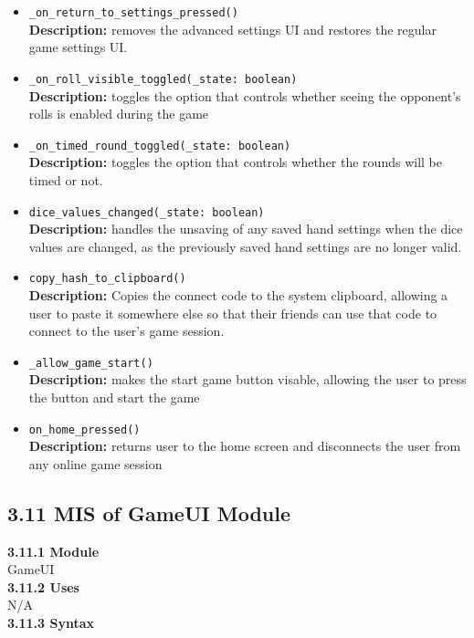 \documentclass[12pt, titlepage]{article}
\begin{document}
\begin{itemize}
	\item \texttt{\_on\_return\_to\_settings\_pressed() }\\
	\textbf{Description:} removes the advanced settings UI and restores the regular game settings UI.
	\item \texttt{\_on\_roll\_visible\_toggled(\_state: boolean) }\\
	\textbf{Description:} toggles the option that controls whether seeing the opponent's rolls is enabled during the game 
	\item \texttt{\_on\_timed\_round\_toggled(\_state: boolean) }\\
	\textbf{Description:} toggles the option that controls whether the rounds will be timed or not.
	\item \texttt{dice\_values\_changed(\_state: boolean) }\\
	\textbf{Description:} handles the unsaving of any saved hand settings when the dice values are changed, as the previously saved hand settings are no longer valid.
	\item \texttt{copy\_hash\_to\_clipboard() }\\
	\textbf{Description:} Copies the connect code to the system clipboard, allowing a user to paste it somewhere else so that their friends can use that code to connect to the user's game session.
	\item \texttt{\_allow\_game\_start() }\\
	\textbf{Description:} makes the start game button visable, allowing the user to press the button and start the game
	\item \texttt{on\_home\_pressed() }\\
	\textbf{Description:} returns user to the home screen and disconnects the user from any online game session
	 
	
	
\end{itemize}

\subsection*{3.11 MIS of GameUI Module}
\textbf{3.11.1 Module}\\
 GameUI\\

\noindent \textbf{3.11.2 Uses}\\
N/A \\

\noindent \textbf{3.11.3 Syntax}
\end{document}
